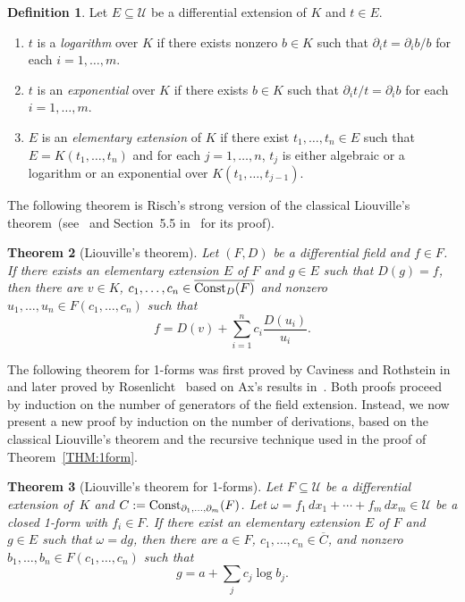 \documentclass{amsart}
\newtheorem{thm}{Theorem}
\theoremstyle{definition}
\newtheorem{defin}[thm]{Definition}
\numberwithin{equation}{section}
\numberwithin{thm}{section}
\newcommand{\Const}{\text{\rm Const}}
\begin{document}
\begin{defin} 
Let $E\subseteq \mathcal{U}$ be a differential extension of $K$ and $t\in E$.
\begin{enumerate}
\item $t$ is a \textit{logarithm} over $K$ if there exists nonzero $b\in K$ such that $\partial_i t=\partial_i b/b$ for each $i =1,\ldots,m$.
\item $t$ is an \textit{exponential} over $K$ if there exists $b\in K$ such that $\partial_i t/t = \partial_i b$ for each $i =1,\ldots,m$.
\item $E$ is an \textit{elementary extension} of $K$ if there exist $t_1, \ldots, t_n\in E$ such that $E=K(t_1,\ldots,t_n)$ and for each $ j = 1,\ldots,n$, $t_j$ is either algebraic or a logarithm or an exponential over $K(t_1,\ldots,t_{j-1})$.
\end{enumerate}
\end{defin}

The following theorem is Risch's strong version of the classical Liouville's theorem~(see~\cite{Rosenlicht1968,Risch1969} and Section~5.5 in~\cite{Bronstein} for its proof).

\begin{thm}[Liouville's theorem]\label{THM:liouville}
	Let $(F,D)$ be a differential field and $f\in F$. If there exists an elementary extension $E$ of $F$ and $g\in E$ such that $D(g)=f$, then there are $v\in K$, $c_1,\ldots,c_n \in \overline{\Const_D(F)}$ and nonzero $u_1,\ldots,u_n \in F(c_1,\ldots,c_n)$ such that
	\[f = D(v) + \sum_{i=1}^{n} c_i \frac{D(u_i)}{u_i}.\]
\end{thm}

The following theorem for 1-forms was first proved by Caviness and Rothstein in~\cite{Caviness1975} and later proved by Rosenlicht~\cite{Rosenlicht1976} based on Ax's results in~\cite{Ax1971}. Both proofs proceed by induction on the number of generators of the field extension. Instead, we now present a new proof by induction on the number of derivations, based on the classical Liouville's theorem and the recursive technique used in the proof of Theorem~\ref{THM:1form}. 

\begin{thm}[Liouville's theorem for 1-forms]\label{THM:Liouville1form}
	Let $F \subseteq \mathcal{U}$ be a differential extension of~$K$  and $C := \Const_{\partial_1,\dots,\partial_m}(F)$. Let $\omega=f_1 \, dx_1+\cdots+f_m \, dx_m \in \mathcal{U}$ be a closed 1-form with $f_i \in F$. If there exist an elementary
extension $E$ of $F$ and $g\in E$ such that $\omega =dg$, then there are $a\in F$, $c_1,\ldots,c_n \in \overline{C}$, and nonzero $b_1,\ldots,b_n\in F(c_1,\ldots,c_n)$ such that
	\[g = a+\sum_{j}c_j \log b_j.\]
\end{thm}
\end{document}
